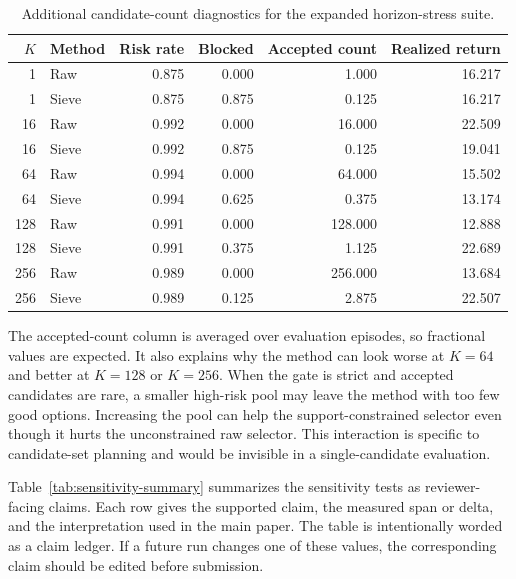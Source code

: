 \documentclass{article}
\begin{document}
\begin{table}[t]
\caption{Additional candidate-count diagnostics for the expanded horizon-stress suite.}
\label{tab:candidate-diagnostics}
\begin{center}
\small
\begin{tabular}{rlrrrr}
\toprule
\(K\) & Method & Risk rate & Blocked & Accepted count & Realized return \\
\midrule
1 & Raw & 0.875 & 0.000 & 1.000 & 16.217 \\
1 & Sieve & 0.875 & 0.875 & 0.125 & 16.217 \\
16 & Raw & 0.992 & 0.000 & 16.000 & 22.509 \\
16 & Sieve & 0.992 & 0.875 & 0.125 & 19.041 \\
64 & Raw & 0.994 & 0.000 & 64.000 & 15.502 \\
64 & Sieve & 0.994 & 0.625 & 0.375 & 13.174 \\
128 & Raw & 0.991 & 0.000 & 128.000 & 12.888 \\
128 & Sieve & 0.991 & 0.375 & 1.125 & 22.689 \\
256 & Raw & 0.989 & 0.000 & 256.000 & 13.684 \\
256 & Sieve & 0.989 & 0.125 & 2.875 & 22.507 \\
\bottomrule
\end{tabular}
\end{center}
\end{table}

The accepted-count column is averaged over evaluation episodes, so fractional values are expected. It also explains why the method can look worse at \(K=64\) and better at \(K=128\) or \(K=256\). When the gate is strict and accepted candidates are rare, a smaller high-risk pool may leave the method with too few good options. Increasing the pool can help the support-constrained selector even though it hurts the unconstrained raw selector. This interaction is specific to candidate-set planning and would be invisible in a single-candidate evaluation.

Table~\ref{tab:sensitivity-summary} summarizes the sensitivity tests as reviewer-facing claims. Each row gives the supported claim, the measured span or delta, and the interpretation used in the main paper. The table is intentionally worded as a claim ledger. If a future run changes one of these values, the corresponding claim should be edited before submission.
\end{document}
